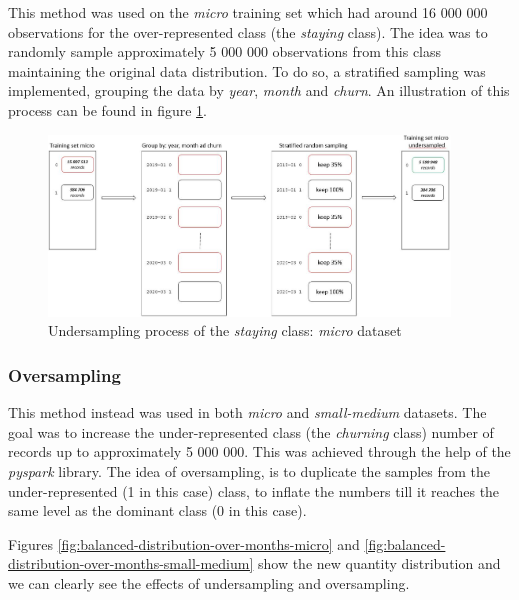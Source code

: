 \documentclass[LaM,binding=0.6cm, english]{sapthesis}
\begin{document}
This method was used on the \textit{micro} training set which had around 16 000 000 observations for the over-represented class (the \textit{staying} class). The idea was to randomly sample approximately 5 000 000 observations from this class maintaining the original data distribution. To do so, a stratified sampling was implemented, grouping the data by \textit{year}, \textit{month} and \textit{churn}. An illustration of this process can be found in figure \ref{fig:undersampling-staying-class-micro}.

\begin{figure}[!ht]
    \includegraphics[width=0.95\textwidth]{images/undersampling-staying-class-micro.jpg}
    \centering
    \caption{Undersampling process of the \textit{staying} class: \textit{micro} dataset}
    \label{fig:undersampling-staying-class-micro}
\end{figure}

\subsubsection{Oversampling}

This method instead was used in both \textit{micro} and \textit{small-medium} datasets. The goal was to increase the under-represented class (the \textit{churning} class) number of records up to approximately 5 000 000. This was achieved through the help of the \textit{pyspark} library. The idea of oversampling, is to duplicate the samples from the under-represented (1 in this case) class, to inflate the numbers till it reaches the same level as the dominant class (0 in this case).

Figures \ref{fig:balanced-distribution-over-months-micro} and \ref{fig:balanced-distribution-over-months-small-medium} show the new quantity distribution and we can clearly see the effects of undersampling and oversampling.
\end{document}
